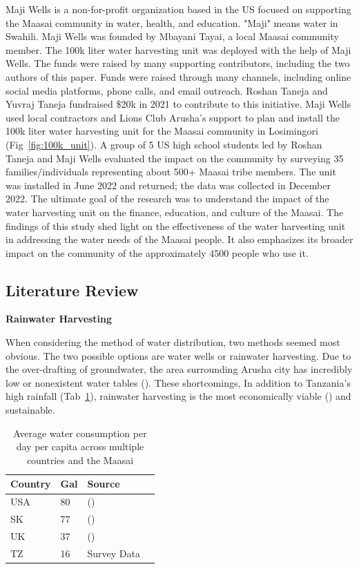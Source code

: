 \documentclass[10pt, twocolumn]{article}
\begin{document}
Maji Wells is a non-for-profit organization based in the US focused on supporting the Maasai community in water, health, and education. "Maji" means water in Swahili. Maji Wells was founded by Mbayani Tayai, a local Maasai community member. The 100k liter water harvesting unit was deployed with the help of Maji Wells. The funds were raised by many supporting contributors, including the two authors of this paper. Funds were raised through many channels, including online social media platforms, phone calls, and email outreach. Roshan Taneja and Yuvraj Taneja fundraised \$20k in 2021 to contribute to this initiative. Maji Wells used local contractors and Lions Club Arusha's support to plan and install the 100k liter water harvesting unit for the Maasai community in Losimingori (Fig~\ref{fig:100k_unit}). A group of 5 US high school students led by Roshan Taneja and Maji Wells evaluated the impact on the community by surveying 35 families/individuals representing about 500+ Maasai tribe members. The unit was installed in June 2022 and returned; the data was collected in December 2022. The ultimate goal of the research was to understand the impact of the water harvesting unit on the finance, education, and culture of the Maasai. The findings of this study shed light on the effectiveness of the water harvesting unit in addressing the water needs of the Maasai people. It also emphasizes its broader impact on the community of the approximately 4500 people who use it.

\subsection{Literature Review}

\textbf{Rainwater Harvesting}

When considering the method of water distribution, two methods seemed most obvious. The two possible options are water wells or rainwater harvesting. Due to the over-drafting of groundwater, the area surrounding Arusha city has incredibly low or nonexistent water tables (\autocite{Ongor2007}). These shortcomings, In addition to Tanzania's high rainfall (Tab~\ref{tab:water_consumption}), rainwater harvesting is the most economically viable (\autocite{TZ_Water_Harvesting}) and sustainable.

\begin{table}
    \begin{tabular}{@{}llll@{}}
    \toprule
    Country & \multicolumn{1}{l}{Gal} & Source &  \\ \midrule
    USA & 80 & (\autocite{USA_Water}) &  \\
    SK & 77 & (\autocite{SK_Water}) &  \\
    UK & 37 & (\autocite{UK_Water}) &  \\
    TZ & 16& Survey Data & \\ \bottomrule
    \end{tabular}
    \caption{Average water consumption per day per capita across multiple countries and the Maasai}
    \label{tab:water_consumption}
\end{table}
\end{document}
